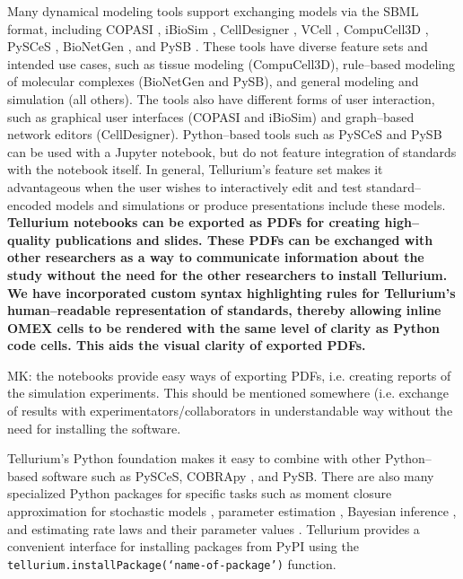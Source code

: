 \documentclass[10pt,letterpaper]{article}
\begin{document}
Many dynamical modeling tools support exchanging models via the SBML format, including COPASI \cite{hoops2006copasi,mendes2009computational}, iBioSim \cite{myers2009ibiosim}, CellDesigner \cite{Funahashi2008,Funahashi2003159}, VCell \cite{moraru2008virtual,schaff2016rule}, CompuCell3D \cite{swat2012multi}, PySCeS \cite{olivier2005modelling}, BioNetGen \cite{blinov2004bionetgen}, and PySB \cite{lopez2013programming}. These tools have diverse feature sets and intended use cases, such as tissue modeling (CompuCell3D), rule--based modeling of molecular complexes (BioNetGen and PySB), and general modeling and simulation (all others). The tools also have different forms of user interaction, such as graphical user interfaces (COPASI and iBioSim) and graph--based network editors (CellDesigner). Python--based tools such as PySCeS and PySB can be used with a Jupyter notebook, but do not feature integration of standards with the notebook itself. In general, Tellurium's feature set makes it advantageous when the user wishes to interactively edit and test standard--encoded models and simulations or produce presentations include these models. \textbf{Tellurium notebooks can be exported as PDFs for creating high--quality publications and slides. These PDFs can be exchanged with other researchers as a way to communicate information about the study without the need for the other researchers to install Tellurium. We have incorporated custom syntax highlighting rules for Tellurium's human--readable representation of standards, thereby allowing inline OMEX cells to be rendered with the same level of clarity as Python code cells. This aids the visual clarity of exported PDFs.}

{\color{orange} MK: the notebooks provide easy ways of exporting PDFs, i.e. creating reports of the simulation experiments. This should be mentioned somewhere (i.e. exchange of results with experimentators/collaborators in understandable way without the need for installing the software.}

Tellurium's Python foundation makes it easy to combine with other Python--based software such as PySCeS, COBRApy \cite{ebrahim2013cobrapy}, and PySB. There are also many specialized Python packages for specific tasks such as moment closure approximation for stochastic models \cite{fan2016means}, parameter estimation \cite{Swaminathan121152}, Bayesian inference \cite{liepe2010abc}, and estimating rate laws and their parameter values \cite{Theisen065177}. Tellurium provides a convenient interface for installing packages from PyPI using the \texttt{tellurium.installPackage(`name-of-package')} function.
\end{document}
